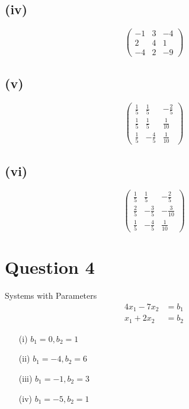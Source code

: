 \documentclass[12pt]{article}
\begin{document}
\subsection*{(iv)}
\[
\begin{pmatrix}
-1 & 3 & -4\\
2 & 4 & 1\\
-4 & 2 & -9
\end{pmatrix}
\]

\subsection*{(v)}
\[
\begin{pmatrix}
\frac{1}{5} & \frac{1}{5} & -\frac{2}{5}\\
\frac{1}{5} & \frac{1}{5} & \frac{1}{10}\\
\frac{1}{5} & -\frac{4}{5} & \frac{1}{10}
\end{pmatrix}
\]

\subsection*{(vi)}
\[
\begin{pmatrix}
\frac{1}{5} & \frac{1}{5} & -\frac{2}{5}\\
\frac{2}{5} & -\frac{3}{5} & -\frac{3}{10}\\
\frac{1}{5} & -\frac{4}{5} & \frac{1}{10}
\end{pmatrix}
\]

\section*{Question 4}
Systems with Parameters
\[
\begin{aligned}
4x_1 - 7x_2 &= b_1\\
x_1 + 2x_2 &= b_2
\end{aligned}
\]

\begin{itemize}
\item[(i)] $b_1 = 0, b_2 = 1$
\item[(ii)] $b_1 = -4, b_2 = 6$
\item[(iii)] $b_1 = -1, b_2 = 3$
\item[(iv)] $b_1 = -5, b_2 = 1$
\end{itemize}
\end{document}
